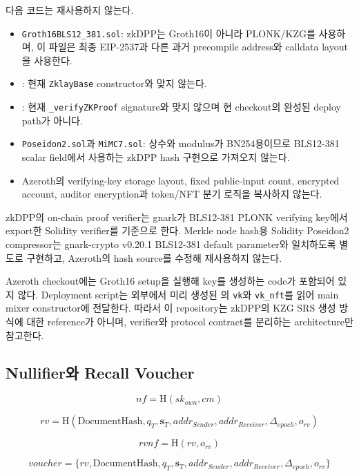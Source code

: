 \documentclass[11pt,a4paper]{extarticle}
\newcommand{\Hash}{\mathrm{H}}
\newcommand{\DocumentHash}{\mathrm{DocumentHash}}
\begin{document}
다음 코드는 재사용하지 않는다.

\begin{itemize}
  \item \texttt{Groth16BLS12\_381.sol}: zkDPP는 Groth16이 아니라 PLONK/KZG를 사용하며,
        이 파일은 최종 EIP-2537과 다른 과거 precompile address와 calldata layout을
        사용한다.
  \item {}: 현재 \texttt{ZklayBase} constructor와 맞지 않는다.
  \item {}: 현재 \texttt{\_verifyZKProof} signature와
        맞지 않으며 현 checkout의 완성된 deploy path가 아니다.
  \item \texttt{Poseidon2.sol}과 \texttt{MiMC7.sol}: 상수와 modulus가 BN254용이므로
        BLS12-381 scalar field에서 사용하는 zkDPP hash 구현으로 가져오지 않는다.
  \item Azeroth의 verifying-key storage layout, fixed public-input count,
        encrypted account, auditor encryption과 token/NFT 분기 로직을 복사하지 않는다.
\end{itemize}

zkDPP의 on-chain proof verifier는 gnark가 BLS12-381 PLONK verifying key에서 export한
Solidity verifier를 기준으로 한다. Merkle node hash용 Solidity Poseidon2 compressor는
gnark-crypto v0.20.1 BLS12-381 default parameter와 일치하도록 별도로 구현하고,
Azeroth의 hash source를 수정해 재사용하지 않는다.

Azeroth checkout에는 Groth16 setup을 실행해 key를 생성하는 code가 포함되어 있지 않다.
Deployment script는 외부에서 미리 생성된
의 \texttt{vk}와 \texttt{vk\_nft}를 읽어
main mixer constructor에 전달한다. 따라서 이 repository는 zkDPP의 KZG SRS 생성 방식에
대한 reference가 아니며, verifier와 protocol contract를 분리하는 architecture만 참고한다.

\subsection{Nullifier와 Recall Voucher}

\[
nf=\Hash(sk_{own},cm)
\]

\[
rv=\Hash(
\DocumentHash,q_T,\mathbf{s}_T,
addr_{Sender},addr_{Receiver},\Delta_{epoch},o_{rv}
)
\]

\[
rvnf=\Hash(rv,o_{rv})
\]

\[
\mathit{voucher}=\{
rv,\DocumentHash,q_T,\mathbf{s}_T,
addr_{Sender},addr_{Receiver},\Delta_{epoch},o_{rv}
\}
\]
\end{document}
